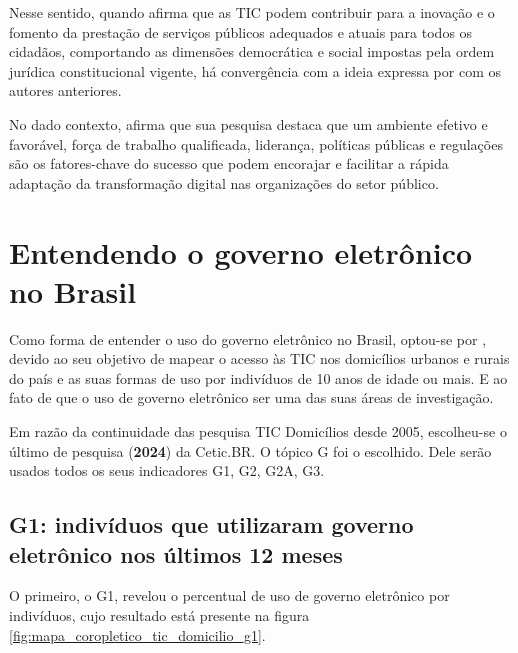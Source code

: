 Nesse sentido, quando \cite{cristovam2020governo} afirma que as TIC podem contribuir para a inovação e o fomento da prestação de serviços públicos adequados e atuais para todos os cidadãos, comportando as dimensões democrática e social impostas pela ordem jurídica constitucional vigente, há convergência com a ideia expressa por \cite{kotenok2020government} com os autores anteriores.

No dado contexto, \cite{alenezi2022understanding} afirma que sua pesquisa destaca que um ambiente efetivo e favorável, força de trabalho qualificada, liderança, políticas públicas e regulações são os fatores-chave do sucesso que podem encorajar e facilitar a rápida adaptação da transformação digital nas organizações do setor público.

\section{Entendendo o governo eletrônico no Brasil}
	
Como forma de entender o uso do governo eletrônico no Brasil, optou-se por \cite{tic_domicilios_2024}, devido ao seu objetivo de mapear o acesso às TIC nos domicílios urbanos e rurais do país e as suas formas de uso por indivíduos de 10 anos de idade ou mais. E ao fato de que o uso de governo eletrônico ser uma das suas áreas de investigação.

Em razão da continuidade das pesquisa TIC Domicílios desde 2005, escolheu-se o último de pesquisa (\textbf{2024}) da Cetic.BR. O tópico G foi o escolhido. Dele serão usados todos os seus indicadores G1, G2, G2A, G3. 

\subsection{G1: indivíduos que utilizaram governo eletrônico nos últimos 12 meses}

O primeiro, o G1, revelou o percentual de uso de governo eletrônico por indivíduos, cujo resultado está presente na figura \ref{fig:mapa_coropletico_tic_domicilio_g1}.

